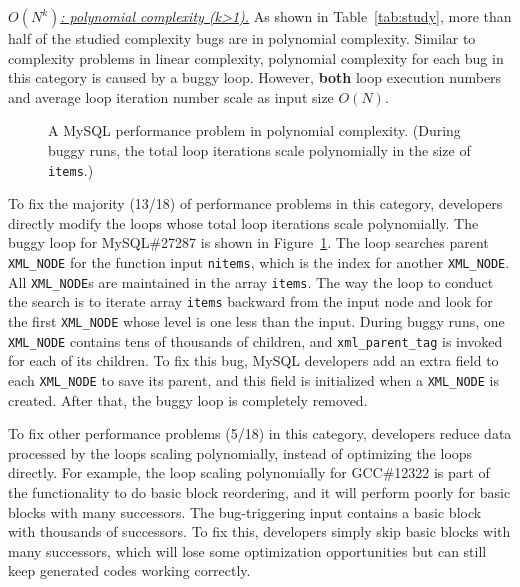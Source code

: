 {\underline{\textit{$O(N^k)$: polynomial complexity (k>1).}}}
As shown in Table~\ref{tab:study}, 
more than half of the studied complexity bugs are in polynomial complexity. 
Similar to complexity problems in linear complexity,
polynomial complexity for each bug in this category is caused by a buggy loop.
However, {\bf both} loop execution numbers and average loop iteration number
scale as input size $O(N)$.



\begin{figure}
\centering
{}
  \mbox{}
\caption{A MySQL performance problem in polynomial complexity. 
  (During buggy runs, the total loop iterations scale polynomially in the size of \texttt{items}.)}
\vspace{-0.05in}
\label{fig:mysql27287}
\vspace{-0.05in}
\end{figure}

To fix the majority (13/18) of performance problems in this category, 
developers directly modify the loops whose total loop iterations scale polynomially.  
The buggy loop for MySQL\#27287 is shown in Figure~\ref{fig:mysql27287}.
The loop searches parent \texttt{XML\_NODE} for the function input \texttt{nitems}, 
which is the index for another \texttt{XML\_NODE}.
All \texttt{XML\_NODE}s are maintained in the array \texttt{items}. 
The way the loop to conduct the search is to iterate array \texttt{items} 
backward from the input node and look for the first \texttt{XML\_NODE} 
whose level is one less than the input.
During buggy runs, one \texttt{XML\_NODE} contains tens of thousands of children, 
and \texttt{xml\_parent\_tag} is invoked for each of its children. 
To fix this bug, MySQL developers add an extra field to each 
\texttt{XML\_NODE} to save its parent, 
and this field is initialized when a \texttt{XML\_NODE} is created. 
After that, the buggy loop is completely removed. 

To fix other performance problems (5/18) in this category, 
developers reduce data processed by the loops scaling polynomially, 
instead of optimizing the loops directly. 
For example, the loop scaling polynomially for GCC\#12322 is part 
of the functionality to do basic block reordering, 
and it will perform poorly for basic blocks with many successors. 
The bug-triggering input contains a basic block with thousands of successors. 
To fix this, developers simply skip basic blocks with many successors, 
which will lose some optimization opportunities 
but can still keep generated codes working correctly. 


